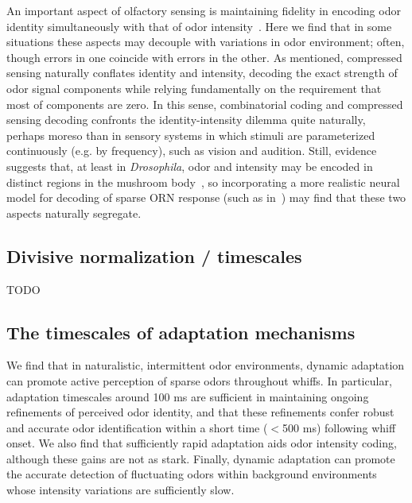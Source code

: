 An important aspect of olfactory sensing is maintaining fidelity in encoding odor identity simultaneously with that of odor intensity~\cite{intensity_vs_identity}. Here we find that in some situations these aspects may decouple with variations in odor environment; often, though errors in one coincide with errors in the other. As mentioned, compressed sensing naturally conflates identity and intensity, decoding the exact strength of odor signal components while relying fundamentally on the requirement that most of components are zero. In this sense, combinatorial coding and compressed sensing decoding confronts the identity-intensity dilemma quite naturally, perhaps moreso than in sensory systems in which stimuli are parameterized continuously (e.g. by frequency), such as vision and audition. Still, evidence suggests that, at least in \textit{Drosophila}, odor and intensity may be encoded in distinct regions in the mushroom body~\cite{segregation_intensity_identity}, so incorporating a more realistic neural model for decoding of sparse ORN response (such as in~\cite{sharpee_zhang}) may find that these two aspects naturally segregate.


\subsection{Divisive normalization / timescales}
{\color{blue} TODO}

\subsection{The timescales of adaptation mechanisms}

We find that in naturalistic, intermittent odor environments, dynamic adaptation can promote active perception of sparse odors throughout whiffs. In particular, adaptation timescales around 100 ms are sufficient in maintaining ongoing refinements of perceived odor identity, and that these refinements confer robust and accurate odor identification within a short time ($<$500 ms) following whiff onset. We also find that sufficiently rapid adaptation aids odor intensity coding, although these gains are not as stark. Finally, dynamic adaptation can promote the accurate detection of fluctuating odors within background environments whose intensity variations are sufficiently slow. 



